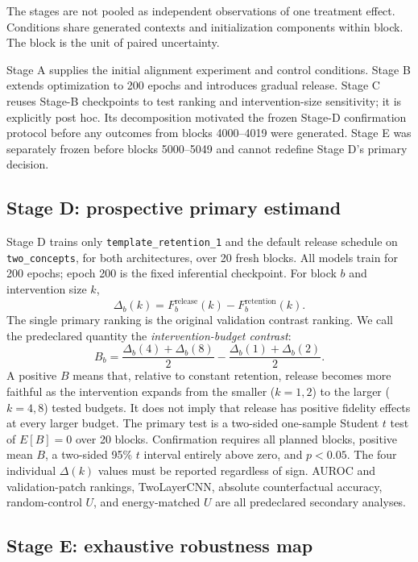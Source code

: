\documentclass[10pt]{article}
\begin{document}
The stages are not pooled as independent observations of one treatment effect. Conditions share generated contexts and initialization components within block. The block is the unit of paired uncertainty.

Stage A supplies the initial alignment experiment and control conditions. Stage B extends optimization to 200 epochs and introduces gradual release. Stage C reuses Stage-B checkpoints to test ranking and intervention-size sensitivity; it is explicitly post hoc. Its decomposition motivated the frozen Stage-D confirmation protocol before any outcomes from blocks 4000--4019 were generated. Stage E was separately frozen before blocks 5000--5049 and cannot redefine Stage D's primary decision.

\subsection{Stage D: prospective primary estimand}\label{sec:stage-d-method}

Stage D trains only \texttt{template\_retention\_1} and the default release schedule on \texttt{two\_concepts}, for both architectures, over 20 fresh blocks. All models train for 200 epochs; epoch 200 is the fixed inferential checkpoint. For block $b$ and intervention size $k$,
\[
\Delta_b(k)=F_{b}^{\mathrm{release}}(k)-F_{b}^{\mathrm{retention}}(k).
\]
The single primary ranking is the original validation contrast ranking. We call the predeclared quantity the \emph{intervention-budget contrast}:
\[
B_b=\frac{\Delta_b(4)+\Delta_b(8)}{2}
-\frac{\Delta_b(1)+\Delta_b(2)}{2}.
\]
A positive $B$ means that, relative to constant retention, release becomes more faithful as the intervention expands from the smaller ($k=1,2$) to the larger ($k=4,8$) tested budgets. It does not imply that release has positive fidelity effects at every larger budget. The primary test is a two-sided one-sample Student $t$ test of $E[B]=0$ over 20 blocks. Confirmation requires all planned blocks, positive mean $B$, a two-sided 95\% $t$ interval entirely above zero, and $p<0.05$. The four individual $\Delta(k)$ values must be reported regardless of sign. AUROC and validation-patch rankings, TwoLayerCNN, absolute counterfactual accuracy, random-control $U$, and energy-matched $U$ are all predeclared secondary analyses.

\subsection{Stage E: exhaustive robustness map}\label{sec:stage-e-method}
\end{document}
